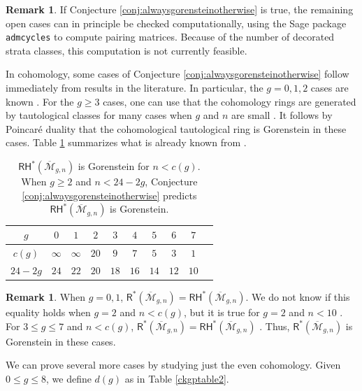 \documentclass[12pt]{amsart}
\theoremstyle{definition}
\newtheorem{rem}[thm]{Remark}
\newcommand{\R}{\mathsf{R}}
\newcommand{\RH}{\mathsf{RH}}
\newcommand{\M}{\mathcal{M}}
\newcommand{\Mb}{\overline{\M}}
\begin{document}
\begin{rem}
    If Conjecture \ref{conj:alwaysgorensteinotherwise} is true, the remaining open cases can in principle be checked computationally, using the Sage package \texttt{admcycles} \cite{admcycles} to compute pairing matrices. Because of the number of decorated strata classes, this computation is not currently feasible.
\end{rem}
In cohomology, some cases of Conjecture \ref{conj:alwaysgorensteinotherwise} follow immediately from results in the literature. In particular, the $g=0,1,2$ cases are known \cite{Keel,Petersengenusone,PetersenTommasi,Petersen}. For the $g\geq 3$ cases, one can use that the cohomology rings are generated by tautological classes for many cases when $g$ and $n$ are small \cite[Theorem 1.4]{CL-CKgP}. It follows by Poincar\'e duality that the cohomological tautological ring is Gorenstein in these cases. Table \ref{ckgptable} summarizes what is already known from \cite{Keel,Petersengenusone,PetersenTommasi,Petersen,CL-CKgP}.
\begin{table}[h!]
\centering
\begin{tabular}{|c|c|c|c|c|c|c|c|c|c|} 
 \hline
 $g$ & $0$ & $1$ & $2$ & $3$ & $4$ & $5$ & $6$ & $7$ \\
 \hline
 $c(g)$ & $\infty$ & $\infty$ & $20$ & $9$ & $7$ & $5$ & $3$ & $1$  \\ 
\hline
$24-2g$ & $24$ & $22$ & $20$ & $18$ & $16$ & $14$ & $12$ & $10$ \\
\hline
\end{tabular}
\vspace{.1in}
\caption{$\RH^*(\Mb_{g,n})$ is Gorenstein for $n < c(g)$. When $g\geq 2$ and $n<24-2g$, Conjecture \ref{conj:alwaysgorensteinotherwise} predicts $\RH^*(\Mb_{g,n})$ is Gorenstein.}
\label{ckgptable}
\end{table}
\begin{rem}
    When $g=0,1$, $\R^*(\Mb_{g,n})=\RH^*(\Mb_{g,n})$. We do not know if this equality holds when $g=2$ and $n<c(g)$, but it is true for $g=2$ and $n<10$ \cite[Theorem 1.4]{CL-CKgP}. For $3\leq g \leq 7$ and $n<c(g)$, $\R^*(\Mb_{g,n})=\RH^*(\Mb_{g,n})$ \cite[Theorem 1.4]{CL-CKgP}. Thus, $\R^*(\Mb_{g,n})$ is Gorenstein in these cases.
\end{rem}
We can prove several more cases by studying just the even cohomology. Given $0\leq g \leq 8$, we define $d(g)$ as in Table \ref{ckgptable2}.
\end{document}
